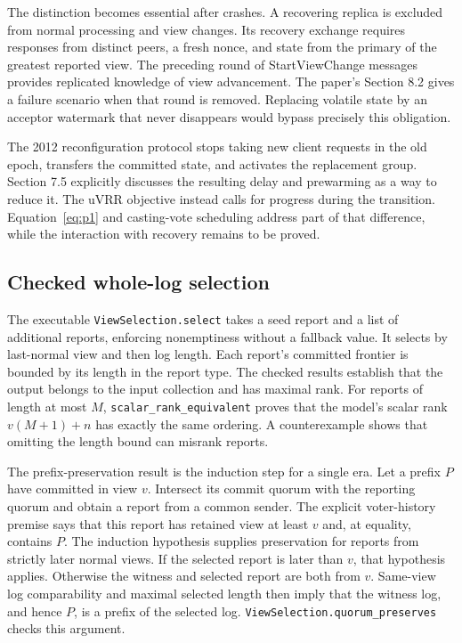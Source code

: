 \documentclass[10pt,journal,letterpaper]{IEEEtran}
\newcommand{\code}[1]{\texttt{\small #1}}
\begin{document}
The distinction becomes essential after crashes. A recovering replica is
excluded from normal processing and view changes. Its recovery exchange
requires responses from distinct peers, a fresh nonce, and state from the
primary of the greatest reported view. The preceding round of
StartViewChange messages provides replicated knowledge of view advancement.
The paper's Section 8.2 gives a failure scenario when that round is removed.
Replacing volatile state by an acceptor watermark that never disappears
would bypass precisely this obligation.

The 2012 reconfiguration protocol stops taking new client requests in the old
epoch, transfers the committed state, and activates the replacement group.
Section 7.5 explicitly discusses the resulting delay and prewarming as a way
to reduce it. The uVRR objective instead calls for progress during the
transition. Equation~\eqref{eq:p1} and casting-vote scheduling address part
of that difference, while the interaction with recovery remains to be proved.

\subsection{Checked whole-log selection}
The executable \code{ViewSelection.select} takes a seed report and a list of
additional reports, enforcing nonemptiness without a fallback value. It selects
by last-normal view and then log length. Each report's committed frontier is
bounded by its length in the report type. The checked results establish that
the output belongs to the input collection and has maximal rank. For reports
of length at most $M$, \code{scalar\_rank\_equivalent} proves that the
model's scalar rank $v(M+1)+n$ has exactly the same ordering. A counterexample
shows that omitting the length bound can misrank reports.

The prefix-preservation result is the induction step for a single era. Let a
prefix $P$ have committed in view $v$. Intersect its commit quorum with the
reporting quorum and obtain a report from a common sender. The explicit
voter-history premise says that this report has retained view at least $v$
and, at equality, contains $P$. The induction hypothesis supplies preservation
for reports from strictly later normal views. If the selected report is later
than $v$, that hypothesis applies. Otherwise the witness and selected report
are both from $v$. Same-view log comparability and maximal selected length
then imply that the witness log, and hence $P$, is a prefix of the selected
log. \code{ViewSelection.quorum\_preserves} checks this argument.
\end{document}
